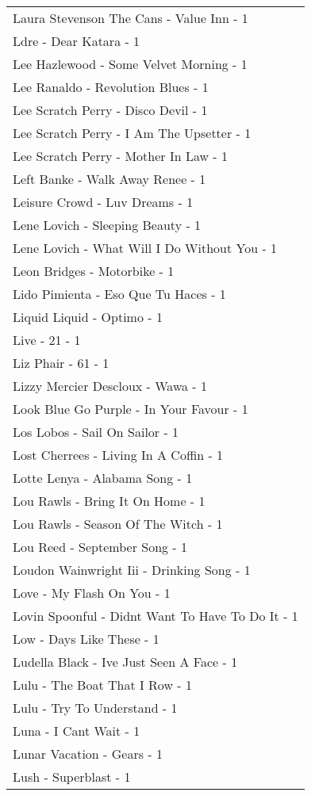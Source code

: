 \documentclass[
]{article}
\begin{document}
\begin{longtable}{l}
Laura Stevenson The Cans - Value Inn - 1 \\ 
Ldre - Dear Katara - 1 \\ 
Lee Hazlewood - Some Velvet Morning - 1 \\ 
Lee Ranaldo - Revolution Blues - 1 \\ 
Lee Scratch Perry - Disco Devil - 1 \\ 
Lee Scratch Perry - I Am The Upsetter - 1 \\ 
Lee Scratch Perry - Mother In Law - 1 \\ 
Left Banke - Walk Away Renee - 1 \\ 
Leisure Crowd - Luv Dreams - 1 \\ 
Lene Lovich - Sleeping Beauty - 1 \\ 
Lene Lovich - What Will I Do Without You - 1 \\ 
Leon Bridges - Motorbike - 1 \\ 
Lido Pimienta - Eso Que Tu Haces - 1 \\ 
Liquid Liquid - Optimo - 1 \\ 
Live - 21 - 1 \\ 
Liz Phair - 61 - 1 \\ 
Lizzy Mercier Descloux - Wawa - 1 \\ 
Look Blue Go Purple - In Your Favour - 1 \\ 
Los Lobos - Sail On Sailor - 1 \\ 
Lost Cherrees - Living In A Coffin - 1 \\ 
Lotte Lenya - Alabama Song - 1 \\ 
Lou Rawls - Bring It On Home - 1 \\ 
Lou Rawls - Season Of The Witch - 1 \\ 
Lou Reed - September Song - 1 \\ 
Loudon Wainwright Iii - Drinking Song - 1 \\ 
Love - My Flash On You - 1 \\ 
Lovin Spoonful - Didnt Want To Have To Do It - 1 \\ 
Low - Days Like These - 1 \\ 
Ludella Black - Ive Just Seen A Face - 1 \\ 
Lulu - The Boat That I Row - 1 \\ 
Lulu - Try To Understand - 1 \\ 
Luna - I Cant Wait - 1 \\ 
Lunar Vacation - Gears - 1 \\ 
Lush - Superblast - 1 \\ 

\end{longtable}
\end{document}
